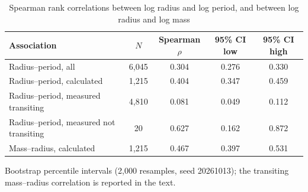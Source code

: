 \begin{table}[t]
\centering
\begin{threeparttable}
\caption{Spearman rank correlations between log radius and log period, and between log radius and log mass}
\label{tab:associations}
\begin{tabular}{lcccc}
\toprule
Association & $N$ & Spearman $\rho$ & 95\% CI low & 95\% CI high \\
\midrule
Radius--period, all & 6,045 & 0.304 & 0.276 & 0.330 \\
Radius--period, calculated & 1,215 & 0.404 & 0.347 & 0.459 \\
Radius--period, measured transiting & 4,810 & 0.081 & 0.049 & 0.112 \\
Radius--period, measured not transiting & 20 & 0.627 & 0.162 & 0.872 \\
Mass--radius, calculated & 1,215 & 0.467 & 0.397 & 0.531 \\
\bottomrule
\end{tabular}
\begin{tablenotes}[flushleft]
\footnotesize
\item Bootstrap percentile intervals (2,000 resamples, seed 20261013); the transiting mass--radius correlation is reported in the text.
\end{tablenotes}
\end{threeparttable}
\end{table}
